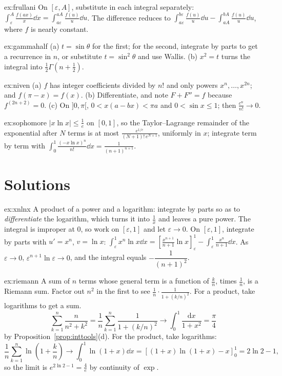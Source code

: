 \begin{hint}{ex:frullani}
On $[\varepsilon,A]$, substitute in each integral separately: $\int_\varepsilon^A\frac{f(ax)}x\dd x=\int_{a\varepsilon}^{aA}\frac{f(u)}u\dd u$. The difference reduces to $\int_{a\varepsilon}^{b\varepsilon}\frac{f(u)}u\dd u-\int_{aA}^{bA}\frac{f(u)}u\dd u$, where $f$ is nearly constant.
\end{hint}
\begin{hint}{ex:gammahalf}
(a) $t=\sin\theta$ for the first; for the second, integrate by parts to get a recurrence in $n$, or substitute $t=\sin^2\theta$ and use Wallis. (b) $x^2=t$ turns the integral into $\frac12\Gamma\left(n+\frac12\right)$.
\end{hint}
\begin{hint}{ex:niven}
(a) $f$ has integer coefficients divided by $n!$ and only powers $x^n,\dots,x^{2n}$; and $f(\pi-x)=f(x)$. (b) Differentiate, and note $F+F''=f$ because $f^{(2n+2)}=0$. (c) On $]0,\pi[$, $0<x(a-bx)<\pi a$ and $0<\sin x\le1$; then $\frac{c^n}{n!}\to0$.
\end{hint}
\begin{hint}{ex:sophomore}
$|x\ln x|\le\frac1e$ on $[0,1]$, so the Taylor--Lagrange remainder of the exponential after $N$ terms is at most $\frac{e^{1/e}}{(N+1)!\,e^{N+1}}$, uniformly in $x$; integrate term by term with $\int_0^1\frac{(-x\ln x)^n}{n!}\dd x=\frac1{(n+1)^{n+1}}$.
\end{hint}

\section{Solutions}
\begin{solution}{ex:xnlnx}
\idea A product of a power and a logarithm: integrate by parts so as to \emph{differentiate} the logarithm, which turns it into $\frac1x$ and leaves a pure power. The integral is improper at $0$, so work on $[\varepsilon,1]$ and let $\varepsilon\to0$.
\writeup On $[\varepsilon,1]$, integrate by parts with $u'=x^n$, $v=\ln x$:
$\int_\varepsilon^1x^n\ln x\dd x=\left[\frac{x^{n+1}}{n+1}\ln x\right]_\varepsilon^1-\int_\varepsilon^1\frac{x^n}{n+1}\dd x$.
As $\varepsilon\to0$, $\varepsilon^{n+1}\ln\varepsilon\to0$, and the integral equals $-\dfrac1{(n+1)^2}$.
\end{solution}

\begin{solution}{ex:riemann}
\idea A sum of $n$ terms whose general term is a function of $\frac kn$, times $\frac1n$, is a Riemann sum. Factor out $n^2$ in the first to see $\frac1n\cdot\frac1{1+(k/n)^2}$. For a product, take logarithms to get a sum.
\writeup
\[
\sum_{k=1}^n\frac n{n^2+k^2}=\frac1n\sum_{k=1}^n\frac1{1+(k/n)^2}\to\int_0^1\frac{\mathrm dx}{1+x^2}=\frac\pi4
\]
 by Proposition~\ref{prop:inttools}(d).
For the product, take logarithms:
\[
\frac1n\sum_{k=1}^n\ln\left(1+\frac kn\right)\to\int_0^1\ln(1+x)\dd x=\left[(1+x)\ln(1+x)-x\right]_0^1=2\ln2-1,
\]
so the limit is $e^{2\ln2-1}=\frac4e$ by continuity of $\exp$.
\end{solution}

